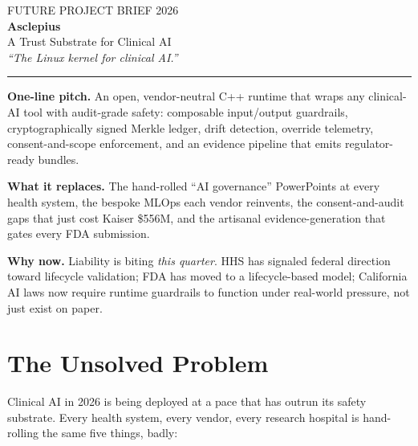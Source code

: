 \documentclass[11pt,a4paper]{article}
\begin{document}
\begin{center}
  \vspace*{-1.2cm}
  {\color{muted}\small FUTURE PROJECT BRIEF \textbullet{} 2026}\\[0.4em]
  {\color{primary}\Huge\bfseries Asclepius}\\[0.3em]
  {\color{dark}\Large A Trust Substrate for Clinical AI}\\[0.2em]
  {\color{muted}\itshape ``The Linux kernel for clinical AI.''}\\[0.4em]
  \rule{0.35\textwidth}{0.5pt}
\end{center}

\vspace{0.6em}

\begin{callout}
\textbf{One-line pitch.} An open, vendor-neutral C++ runtime that wraps any clinical-AI tool with audit-grade safety: composable input/output guardrails, cryptographically signed Merkle ledger, drift detection, override telemetry, consent-and-scope enforcement, and an evidence pipeline that emits regulator-ready bundles.

\vspace{0.4em}
\textbf{What it replaces.} The hand-rolled ``AI governance'' PowerPoints at every health system, the bespoke MLOps each vendor reinvents, the consent-and-audit gaps that just cost Kaiser \$556M, and the artisanal evidence-generation that gates every FDA submission.

\vspace{0.4em}
\textbf{Why now.} Liability is biting \emph{this quarter}. HHS has signaled federal direction toward lifecycle validation; FDA has moved to a lifecycle-based model; California AI laws now require runtime guardrails to function under real-world pressure, not just exist on paper.
\end{callout}

\section{The Unsolved Problem}

Clinical AI in 2026 is being deployed at a pace that has outrun its safety substrate. Every health system, every vendor, every research hospital is hand-rolling the same five things, badly:
\end{document}

